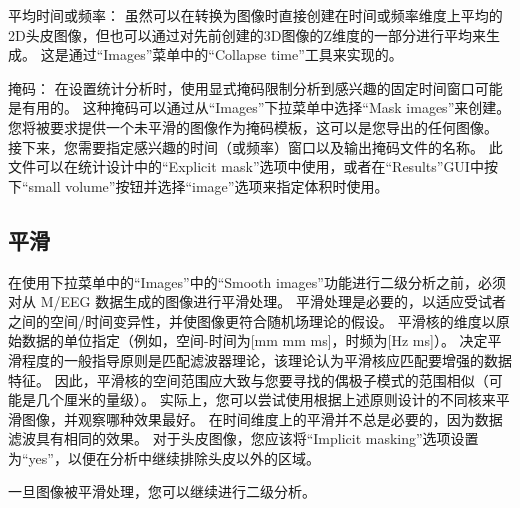 平均时间或频率：
虽然可以在转换为图像时直接创建在时间或频率维度上平均的2D头皮图像，但也可以通过对先前创建的3D图像的Z维度的一部分进行平均来生成。
这是通过“Images”菜单中的“Collapse time”工具来实现的。

掩码：
在设置统计分析时，使用显式掩码限制分析到感兴趣的固定时间窗口可能是有用的。
这种掩码可以通过从“Images”下拉菜单中选择“Mask images”来创建。
您将被要求提供一个未平滑的图像作为掩码模板，这可以是您导出的任何图像。
接下来，您需要指定感兴趣的时间（或频率）窗口以及输出掩码文件的名称。
此文件可以在统计设计中的“Explicit mask”选项中使用，或者在“Results”GUI中按下“small volume”按钮并选择“image”选项来指定体积时使用。


\subsection{平滑}

在使用下拉菜单中的“Images”中的“Smooth images”功能进行二级分析之前，必须对从 M/EEG 数据生成的图像进行平滑处理。
平滑处理是必要的，以适应受试者之间的空间/时间变异性，并使图像更符合随机场理论的假设。
平滑核的维度以原始数据的单位指定（例如，空间-时间为[mm mm ms]，时频为[Hz ms]）。
决定平滑程度的一般指导原则是匹配滤波器理论，该理论认为平滑核应匹配要增强的数据特征。
因此，平滑核的空间范围应大致与您要寻找的偶极子模式的范围相似（可能是几个厘米的量级）。
实际上，您可以尝试使用根据上述原则设计的不同核来平滑图像，并观察哪种效果最好。
在时间维度上的平滑并不总是必要的，因为数据滤波具有相同的效果。
对于头皮图像，您应该将“Implicit masking”选项设置为“yes”，以便在分析中继续排除头皮以外的区域。

一旦图像被平滑处理，您可以继续进行二级分析。